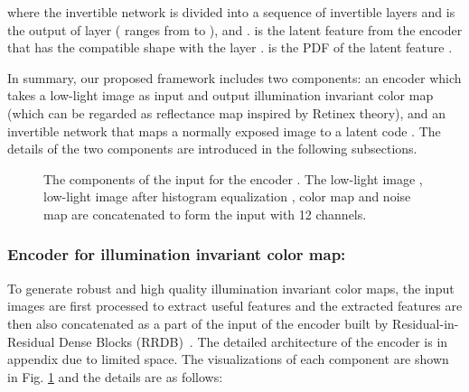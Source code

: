 \documentclass[letterpaper]{article} \usepackage{aaai22}  \usepackage{times}  \usepackage{helvet}  \usepackage{courier}  \usepackage[hyphens]{url}  \usepackage{graphicx} \urlstyle{rm} \def\UrlFont{\rm}  \usepackage{natbib}  \usepackage{caption} \usepackage{subfigure}
\newcommand{\yufei}[1]{{#1}}
\newcommand{\wh}[1]{{#1}}
\begin{document}
where the
\yufei{invertible network 
is divided into a sequence of  invertible layers  and  is the output of layer  ( ranges from  to ),  and .  is the latent feature from the encoder  that has the compatible shape with the layer .  is the PDF of the latent feature .}


In summary, our proposed framework includes two components: an encoder  which takes a low-light image  as input and output illumination invariant color map  (which can be regarded as reflectance map inspired by Retinex theory), and an invertible network \wh{that maps} a normally exposed image to a latent code . The details of the two components are introduced in the following subsections. 


\begin{figure}[tbp]
    \centering
    \caption{
    The components of the input for the encoder . The low-light image , low-light image after histogram equalization , color map  and noise map  are concatenated to form the input with 12 channels.
    }
    \label{fig:encoder_input}
\end{figure}

\subsubsection{Encoder for illumination invariant color map:} To generate robust and high quality illumination invariant color maps, the input images are first processed to extract useful features and the extracted features are then \wh{also} concatenated as \wh{a part of the} input of the encoder built by Residual-in-Residual Dense Blocks (RRDB)~\cite{wang2018esrgan}.
The detailed architecture of the encoder  is in appendix due to limited space. The visualizations of each \wh{component} are shown in Fig. \ref{fig:encoder_input} and the details are as follows:
\end{document}

